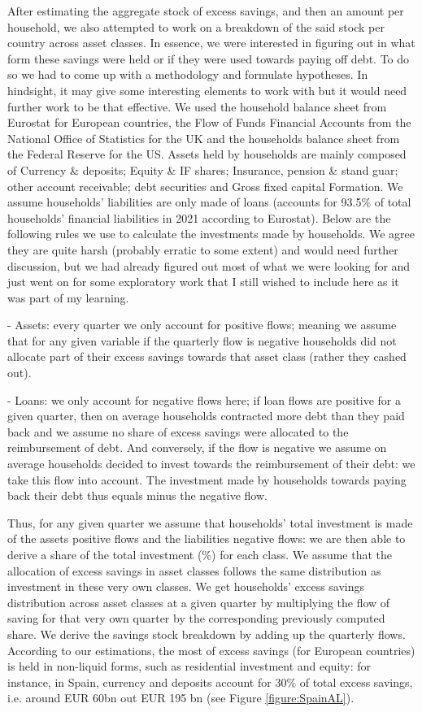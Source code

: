 \quad After estimating the aggregate stock of excess savings, and then an amount per household, we also attempted to work on a breakdown of the said stock per country across asset classes. 
In essence, we were interested in figuring out in what form these savings were held or if they were used towards paying off debt. To do so we had to come up with a methodology and formulate hypotheses. 
In hindsight, it may give some interesting elements to work with but it would need further work to be that effective. 
We used the household balance sheet from Eurostat for European countries, the Flow of Funds Financial Accounts from the National Office of Statistics for the UK and the households balance sheet from the Federal Reserve for the US. 
Assets held by households are mainly composed of Currency \& deposits; Equity \& IF shares; Insurance, pension \& stand guar; other account receivable;	debt securities and Gross fixed capital Formation. We assume households’ liabilities are only made of loans (accounts for 93.5\% of total households' financial liabilities in 2021 according to Eurostat). 
Below are the following rules we use to calculate the investments made by households. We agree they are quite harsh (probably erratic to some extent) and would need further discussion, but we had already figured out most of what we were looking for and just went on for some exploratory work that I still wished to include here as it was part of my learning.

- Assets: every quarter we only account for positive flows; meaning we assume that for any given variable if the quarterly flow is negative households did not allocate part of their excess savings towards that asset class (rather they cashed out).

- Loans: we only account for negative flows here; if loan flows are positive for a given quarter, then on average households contracted more debt than they paid back and we assume no share of excess savings were allocated to the reimbursement of debt. 
And conversely, if the flow is negative we assume on average households decided to invest towards the reimbursement of their debt: we take this flow into account. The investment made by households towards paying back their debt thus equals minus the negative flow. 

Thus, for any given quarter we assume that households' total investment is made of the assets positive flows and the liabilities negative flows: we are then able to derive a share of the total investment (\%) for each class. 
We assume that the allocation of excess savings in asset classes follows the same distribution as investment in these very own classes. 
We get households' excess savings distribution across asset classes at a given quarter by multiplying the flow of saving for that very own quarter by the corresponding previously computed share. 
We derive the savings stock breakdown by adding up the quarterly flows. According to our estimations, the most of excess savings (for European countries) is held in non-liquid forms, such as residential investment and equity: for instance, in Spain, currency and deposits account for 30\% of total excess savings, i.e. around EUR 60bn out EUR 195 bn (see Figure \ref{figure:SpainAL}). 

